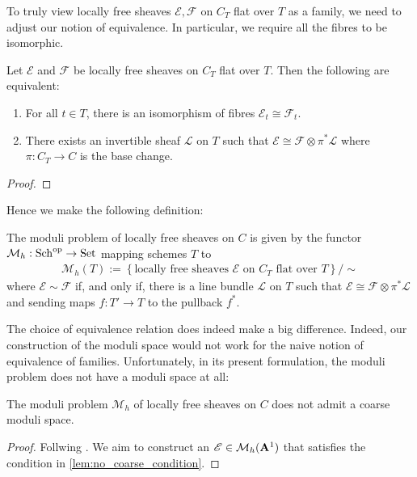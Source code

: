 \documentclass[12pt]{ociamthesis}  %
\begin{document}
To truly view locally free sheaves $\mathscr E,\mathscr F$ on
$C_T$ flat over $T$ as a family, we need to adjust our notion of
equivalence. In particular, we require all the fibres to be isomorphic.

\begin{lemma}
  Let $\mathscr E$ and $\mathscr F$ be locally free sheaves on $C_T$
  flat over $T$. Then the following are equivalent:
  \begin{enumerate}
    \item For all $t\in T$, there is an isomorphism of fibres
          $\mathscr E_t\cong\mathscr F_t$.
    \item There exists an invertible sheaf $\mathscr L$ on
          $T$ such that $\mathscr E \cong \mathscr F \otimes \pi^*\mathscr L$
          where $\pi : C_T \to C$ is the base change.
  \end{enumerate}
  \begin{proof}
    \missingproof
  \end{proof}
\end{lemma}

Hence we make the following definition:

\begin{definition}\label{def:lf_moduli_problem}
  The moduli problem of locally free sheaves on $C$ is given by the
  functor $\mathcal M_h : \operatorname{Sch}^{\text{op}} \to \operatorname{Set}$
  mapping schemes $T$ to
  \begin{align*}
    \mathcal M_h(T) := \left\lbrace{\text{locally free sheaves $\mathscr E$ on $C_T$ flat over $T$}}\right\rbrace/\sim
  \end{align*}
  where $\mathscr E\sim\mathscr F$ if, and only if, there is a line bundle
  $\mathscr L$ on $T$ such that
  $\mathscr E \cong \mathscr F\otimes\pi^* \mathscr L$ and sending
  maps $f: T'\to T$ to the pullback $f^*$.
\end{definition}

The choice of equivalence relation does indeed make a big difference.
Indeed, our construction of the moduli space would not work for the
naive notion of equivalence of families.
Unfortunately, in its present formulation, the moduli problem does not
have a moduli space at all:

\begin{lemma}\label{lem:no_coarse_moduli_space}
  The moduli problem $\mathcal M_h$ of locally free sheaves on $C$
  does not admit a coarse moduli space.
  \begin{proof}
    Follwing \cite[Example 2.2]{hoskins2016}. We aim to construct
    an $\mathscr E\in\mathcal M_h(\mathbf{A}^{1}_{})$ that satisfies the
    condition in \ref{lem:no_coarse_condition}.
    \missingproof
  \end{proof}
\end{lemma}
\end{document}
